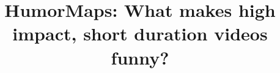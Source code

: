 \documentclass[letterpaper]{article}
\begin{document}
\title{HumorMaps: What makes high impact, short duration videos funny?}

\maketitle 





   
\end{document}
